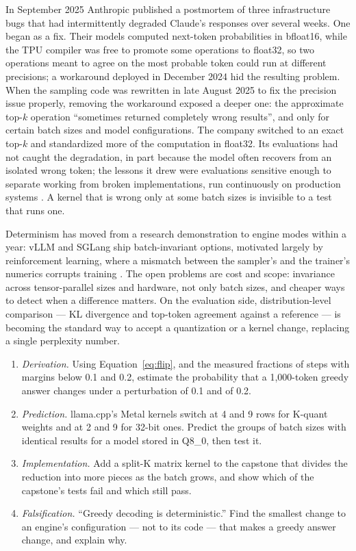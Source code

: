 
In September 2025 Anthropic published a postmortem of three infrastructure bugs
that had intermittently degraded Claude's responses over several weeks. One
began as a fix. Their models computed next-token probabilities in bfloat16,
while the TPU compiler was free to promote some operations to float32, so two
operations meant to agree on the most probable token could run at different
precisions; a workaround deployed in December 2024 hid the resulting
problem. When the sampling code was rewritten in late August 2025 to fix the
precision issue properly, removing the workaround exposed a deeper one: the
approximate top-$k$ operation ``sometimes returned completely wrong results'',
and only for certain batch sizes and model configurations. The company switched to
an exact top-$k$ and standardized more of the computation in float32. Its
evaluations had not caught the degradation, in part because the model often
recovers from an isolated wrong token; the lessons it drew were evaluations
sensitive enough to separate working from broken implementations, run
continuously on production systems \cite{anthropic2025postmortem}. A kernel
that is wrong only at some batch sizes is invisible to a test that runs one.


Determinism has moved from a research demonstration to engine modes within a
year: vLLM and SGLang ship batch-invariant options, motivated largely by
reinforcement learning, where a mismatch between the sampler's and the
trainer's numerics corrupts training \cite{he2025nondeterminism}. The open
problems are cost and scope: invariance across tensor-parallel sizes and
hardware, not only batch sizes, and cheaper ways to detect when a difference
matters. On the evaluation side, distribution-level comparison ---
KL divergence and top-token agreement against a reference --- is becoming the
standard way to accept a quantization or a kernel change, replacing a single
perplexity number.

\ExercisesSection

\begin{enumerate}
\item \emph{Derivation.} Using Equation~\ref{eq:flip}, and the measured
  fractions of steps with margins below 0.1 and 0.2, estimate the probability
  that a 1,000-token greedy answer changes under a perturbation of 0.1 and of
  0.2.
\item \emph{Prediction.} llama.cpp's Metal kernels switch at 4 and 9 rows for
  K-quant weights and at 2 and 9 for 32-bit ones. Predict the groups of batch
  sizes with identical results for a model stored in Q8\_0, then test it.
\item \emph{Implementation.} Add a split-K matrix kernel to the capstone that
  divides the reduction into more pieces as the batch grows, and show which of
  the capstone's tests fail and which still pass.
\item \emph{Falsification.} ``Greedy decoding is deterministic.'' Find the
  smallest change to an engine's configuration --- not to its code --- that
  makes a greedy answer change, and explain why.
\end{enumerate}
